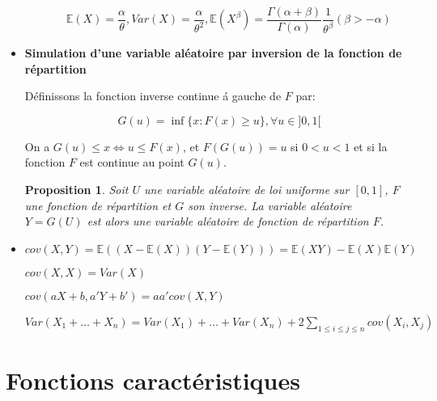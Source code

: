 \documentclass[10pt,a4paper,oneside]{article}
\newtheorem{proposition}{Proposition}
\begin{document}
\begin{itemize}
\begin{itemize}
\[ \mathbb{E}(X) = \frac{\alpha}{\theta}, Var(X) = \frac{\alpha}{\theta^2}, \mathbb{E}(X^\beta) = \frac{\Gamma(\alpha + \beta)}{\Gamma(\alpha)} \frac{1}{\theta^\beta} (\beta > -\alpha) \]

\end{itemize}

\item
\textbf{Simulation d'une variable al\'eatoire par inversion de la fonction de r\'epartition}

D\'efinissons la fonction inverse continue \'a gauche de $F$ par:

\[ G(u) = \inf \{ x : F(x) \geq u \}, \forall u \in ]0,1[ \]

On a $G(u) \leq x \Leftrightarrow u \leq F(x)$, et $F(G(u)) = u$ si $0 < u < 1$ et si la fonction $F$ est continue au point $G(u)$.

\begin{proposition}
Soit $U$ une variable al\'eatoire de loi uniforme sur $[0,1]$, $F$ une fonction de r\'epartition et $G$ son inverse. La variable al\'eatoire $Y = G(U)$ est alors une variable al\'eatoire de fonction de r\'epartition $F$.
\end{proposition}

\item
$cov(X,Y) = \mathbb{E}((X - \mathbb{E}(X))(Y - \mathbb{E}(Y))) = \mathbb{E}(XY) - \mathbb{E}(X)\mathbb{E}(Y)$

$cov(X,X) = Var(X)$

$cov(aX + b,a'Y + b') = aa'cov(X,Y)$

$Var(X_1 + \ldots + X_n) = Var(X_1) + \ldots + Var(X_n) + 2 \sum_{1 \leq i \leq j \leq n} cov(X_i,X_j)$

\end{itemize}

\section{Fonctions caractéristiques}
\end{document}
